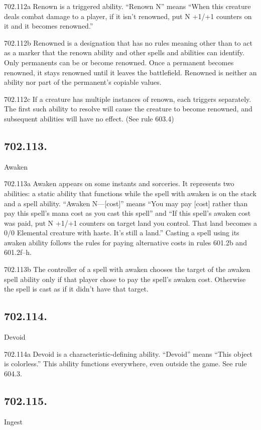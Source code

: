 702.112a Renown is a triggered ability. “Renown N” means “When this creature deals combat damage to a player, if it isn’t renowned, put N +1/+1 counters on it and it becomes renowned.”

702.112b Renowned is a designation that has no rules meaning other than to act as a marker that the renown ability and other spells and abilities can identify. Only permanents can be or become renowned. Once a permanent becomes renowned, it stays renowned until it leaves the battlefield. Renowned is neither an ability nor part of the permanent’s copiable values.

702.112c If a creature has multiple instances of renown, each triggers separately. The first such ability to resolve will cause the creature to become renowned, and subsequent abilities will have no effect. (See rule 603.4)

\subsection*{702.113.}
Awaken

702.113a Awaken appears on some instants and sorceries. It represents two abilities: a static ability that functions while the spell with awaken is on the stack and a spell ability. “Awaken N—[cost]” means “You may pay [cost] rather than pay this spell’s mana cost as you cast this spell” and “If this spell’s awaken cost was paid, put N +1/+1 counters on target land you control. That land becomes a 0/0 Elemental creature with haste. It’s still a land.” Casting a spell using its awaken ability follows the rules for paying alternative costs in rules 601.2b and 601.2f–h.

702.113b The controller of a spell with awaken chooses the target of the awaken spell ability only if that player chose to pay the spell’s awaken cost. Otherwise the spell is cast as if it didn’t have that target.

\subsection*{702.114.}
Devoid

702.114a Devoid is a characteristic-defining ability. “Devoid” means “This object is colorless.” This ability functions everywhere, even outside the game. See rule 604.3.

\subsection*{702.115.}
Ingest

